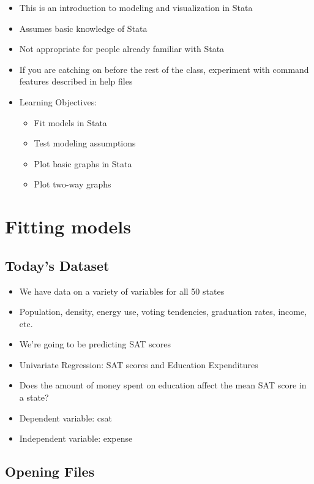 \documentclass[]{book}
\providecommand{\tightlist}{%
  \setlength{\itemsep}{0pt}\setlength{\parskip}{0pt}}
\begin{document}
\begin{itemize}
\tightlist
\item
  This is an introduction to modeling and visualization in Stata
\item
  Assumes basic knowledge of Stata
\item
  Not appropriate for people already familiar with Stata
\item
  If you are catching on before the rest of the class, experiment with
  command features described in help files
\item
  Learning Objectives:

  \begin{itemize}
  \tightlist
  \item
    Fit models in Stata
  \item
    Test modeling assumptions
  \item
    Plot basic graphs in Stata
  \item
    Plot two-way graphs
  \end{itemize}
\end{itemize}

\section{Fitting models}\label{fitting-models}

\subsection{Today's Dataset}\label{todays-dataset}

\begin{itemize}
\tightlist
\item
  We have data on a variety of variables for all 50 states
\item
  Population, density, energy use, voting tendencies, graduation rates,
  income, etc.
\item
  We're going to be predicting SAT scores
\item
  Univariate Regression: SAT scores and Education Expenditures
\item
  Does the amount of money spent on education affect the mean SAT score
  in a state?
\item
  Dependent variable: csat
\item
  Independent variable: expense
\end{itemize}

\subsection{Opening Files}\label{opening-files-1}
\end{document}

